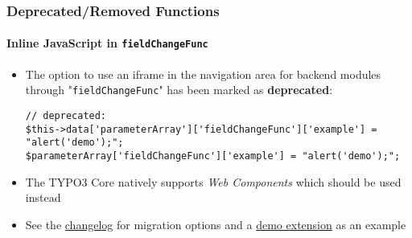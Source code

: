 %

\begin{frame}[fragile]
	\frametitle{Deprecated/Removed Functions}
	\framesubtitle{Inline JavaScript in \texttt{fieldChangeFunc}}


	\begin{itemize}
		\item The option to use an iframe in the navigation area for backend
			modules through "\texttt{fieldChangeFunc}" has been marked as
			\textbf{deprecated}:
\begin{lstlisting}
// deprecated:
$this->data['parameterArray']['fieldChangeFunc']['example'] = "alert('demo');";
$parameterArray['fieldChangeFunc']['example'] = "alert('demo');";
\end{lstlisting}

		\item The TYPO3 Core natively supports \textit{Web Components} which
			should be used instead
		\item See the
			\href{https://docs.typo3.org/c/typo3/cms-core/master/en-us/Changelog/11.5/Deprecation-91787-DeprecateInlineJavaScriptInFieldChangeFunc.html}{changelog}
			for migration options and a
			\href{https://github.com/ohader/demo_91787}{demo extension}
			as an example
	\end{itemize}

\end{frame}

